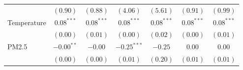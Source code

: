 \documentclass[12pt,letter paper]{article}
\begin{document}
\begin{table}[H]
\begin{center}
\begin{tabular}{l c c c c c c }
                                           & $(0.90)$      & $(0.88)$      & $(4.06)$      & $(5.61)$      & $(0.91)$      & $(0.99)$      \\
\quad Temperature                                 & $0.08^{***}$  & $0.08^{***}$  & $0.08^{***}$  & $0.08^{***}$  & $0.08^{***}$  & $0.08^{***}$  \\
                                           & $(0.00)$      & $(0.01)$      & $(0.00)$      & $(0.02)$      & $(0.00)$      & $(0.01)$      \\
\quad PM2.5                                & $-0.00^{**}$  & $-0.00$       & $-0.25^{***}$ & $-0.25$       & $0.00$        & $0.00$        \\
                                           & $(0.00)$      & $(0.00)$      & $(0.01)$      & $(0.20)$      & $(0.01)$      & $(0.01)$      \\
           

\end{tabular}
\end{center}
\end{table}
\end{document}

